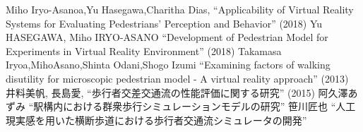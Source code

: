 ﻿%
\begin{thebibliography}{1}
 Miho Iryo-Asanoa,Yu Hasegawa,Charitha Dias,
``Applicability of Virtual Reality Systems for Evaluating Pedestrians’ Perception and Behavior''
 (2018)
 Yu HASEGAWA, Miho IRYO-ASANO
``Development of Pedestrian Model for Experiments in Virtual Reality Environment'' (2018)
 Takamasa Iryoa,MihoAsano,Shinta Odani,Shogo Izumi
``Examining factors of walking disutility for microscopic pedestrian model - A virtual reality approach'' 
(2013)
 井料美帆, 長島愛,
``歩行者交差交通流の性能評価に関する研究''
(2015)
 阿久澤あずみ
``駅構内における群衆歩行シミュレーションモデルの研究''
 笹川匠也
``人工現実感を用いた横断歩道における歩行者交通流シミュレータの開発''
\end{thebibliography}
